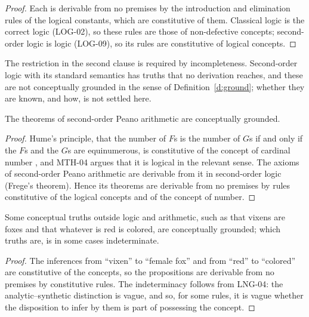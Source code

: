 \documentclass{situationist-preprint}
\begin{document}
\begin{proof}
Each is derivable from no premises by the introduction and elimination rules of the logical constants, which are constitutive of them. Classical logic is the correct logic (LOG-02), so these rules are those of non-defective concepts; second-order logic is logic (LOG-09), so its rules are constitutive of logical concepts.
\end{proof}

The restriction in the second clause is required by incompleteness. Second-order logic with its standard semantics has truths that no derivation reaches, and these are not conceptually grounded in the sense of Definition~\ref{d:ground}; whether they are known, and how, is not settled here.

\begin{proposition}[Arithmetic]\label{p:arith}
The theorems of second-order Peano arithmetic are conceptually grounded.
\end{proposition}

\begin{proof}
Hume's principle, that the number of $F$s is the number of $G$s if and only if the $F$s and the $G$s are equinumerous, is constitutive of the concept of cardinal number \citep{Wright1983,HaleWright2001}, and MTH-04 argues that it is logical in the relevant sense. The axioms of second-order Peano arithmetic are derivable from it in second-order logic (Frege's theorem). Hence its theorems are derivable from no premises by rules constitutive of the logical concepts and of the concept of number.
\end{proof}

\begin{proposition}\label{p:concept}
Some conceptual truths outside logic and arithmetic, such as that vixens are foxes and that whatever is red is colored, are conceptually grounded; which truths are, is in some cases indeterminate.
\end{proposition}

\begin{proof}
The inferences from \enquote{vixen} to \enquote{female fox} and from \enquote{red} to \enquote{colored} are constitutive of the concepts, so the propositions are derivable from no premises by constitutive rules. The indeterminacy follows from LNG-04: the analytic--synthetic distinction is vague, and so, for some rules, it is vague whether the disposition to infer by them is part of possessing the concept.
\end{proof}
\end{document}
